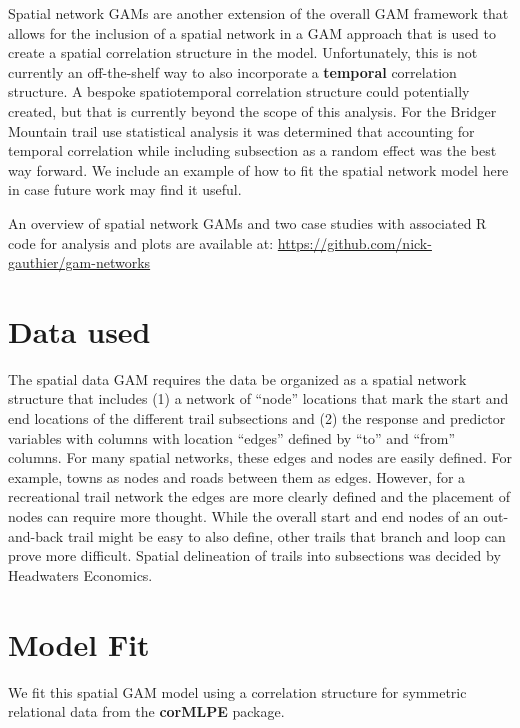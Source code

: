 \documentclass[
]{book}
\begin{document}
Spatial network GAMs are another extension of the overall GAM framework that allows for the inclusion of a spatial network in a GAM approach that is used to create a spatial correlation structure in the model. Unfortunately, this is not currently an off-the-shelf way to also incorporate a \textbf{temporal} correlation structure. A bespoke spatiotemporal correlation structure could potentially created, but that is currently beyond the scope of this analysis. For the Bridger Mountain trail use statistical analysis it was determined that accounting for temporal correlation while including subsection as a random effect was the best way forward. We include an example of how to fit the spatial network model here in case future work may find it useful.

An overview of spatial network GAMs and two case studies with associated R code for analysis and plots are available at: \url{https://github.com/nick-gauthier/gam-networks}

\hypertarget{data-used-2}{%
\section{Data used}\label{data-used-2}}

The spatial data GAM requires the data be organized as a spatial network structure that includes (1) a network of ``node'' locations that mark the start and end locations of the different trail subsections and (2) the response and predictor variables with columns with location ``edges'' defined by ``to'' and ``from'' columns. For many spatial networks, these edges and nodes are easily defined. For example, towns as nodes and roads between them as edges. However, for a recreational trail network the edges are more clearly defined and the placement of nodes can require more thought. While the overall start and end nodes of an out-and-back trail might be easy to also define, other trails that branch and loop can prove more difficult. Spatial delineation of trails into subsections was decided by Headwaters Economics.

\hypertarget{model-fit}{%
\section{Model Fit}\label{model-fit}}

We fit this spatial GAM model using a correlation structure for symmetric relational data from the \textbf{corMLPE} package.
\end{document}
